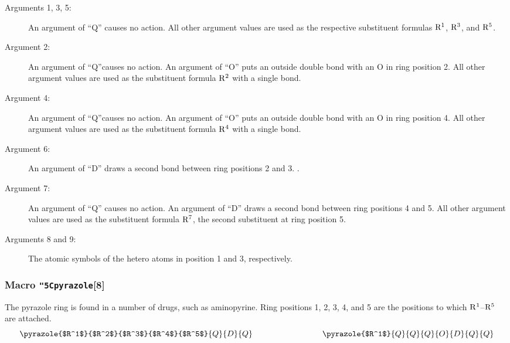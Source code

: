  \begin{description}
 \item[{\rm Arguments 1, 3, 5:}] An argument of ``Q''
      causes no action. All other argument values are used as
      the respective substituent formulas ${\rm R^1}$, ${\rm R^3}$,
      and ${\rm R^5}$.
 \item[{\rm Argument 2:}] An argument of ``Q''causes no
      action. An argument of ``O'' puts an outside double bond
      with an O in ring position 2. All other argument values
      are used as the substituent formula ${\rm R^2}$ with
      a single bond.
 \item[{\rm Argument 4:}] An argument of ``Q''causes
      no action. An argument of ``O'' puts an outside double bond
      with an O in ring position 4. All other argument values
      are used as the substituent formula ${\rm R^4}$ with a
      single bond.
 \item[{\rm Argument 6:}] An argument of ``D'' draws
      a second bond between ring positions 2 and 3. \rii .
 \item[{\rm Argument 7:}] An argument of ``Q'' causes
      no action. An argument of ``D'' draws a second bond
      between ring positions 4 and 5. All other argument values
      are used as the substituent formula ${\rm R^7}$, the second
      substituent at ring position 5.
 \item[{\rm Arguments 8 and 9:}] The atomic symbols of the
      hetero atoms in position 1 and 3, respectively.
 \end{description}
 
\subsubsection{Macro {\tt\char"5C{}pyrazole}[8]}
  The pyrazole ring is found in a number of drugs, such as
 aminopyrine. Ring positions 1, 2, 3, 4, and 5 are the
 positions to which ${\rm R^1}$--${\rm R^5}$ are attached.
    
 \[ \pyrazole{$R^1$}{$R^2$}{$R^3$}{$R^4$}{$R^5$}{Q}{D}{Q}
    \hspace{3cm}
    \pyrazole{$R^1$}{Q}{Q}{Q}{O}{D}{Q}{Q}  \]
 
